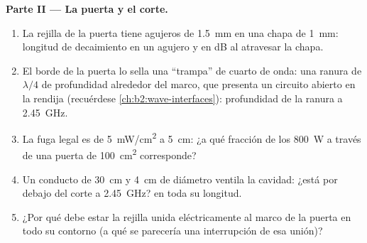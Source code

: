 \begin{problem}
\medskip
\noindent\textbf{Parte II --- La puerta y el corte.}
\begin{enumerate}[resume]
  \item La rejilla de la puerta tiene agujeros de \qty{1.5}{mm} en una chapa de \qty{1}{mm}: longitud
        de decaimiento en un agujero y  en dB al atravesar la chapa.
  \item El borde de la puerta lo sella una ``trampa'' de cuarto de onda: una ranura
        de $\lambda/4$ de profundidad alrededor del marco, que presenta un circuito
        abierto en la rendija (recuérdese \cref{ch:b2:wave-interfaces}): profundidad
        de la ranura a \qty{2.45}{GHz}.
  \item La fuga legal es de \qty{5}{mW/cm^2} a \qty{5}{cm}: ¿a qué fracción de
        los \qty{800}{W} a través de una puerta de \qty{100}{cm^2} corresponde?
  \item Un conducto de \qty{30}{cm} y \qty{4}{cm} de diámetro ventila la cavidad: ¿está
        por debajo del corte a \qty{2.45}{GHz}?  en toda su longitud.
  \item ¿Por qué debe estar la rejilla unida eléctricamente al marco de la puerta en
        todo su contorno (a qué se parecería una interrupción de esa unión)?
\end{enumerate}


\end{problem}
